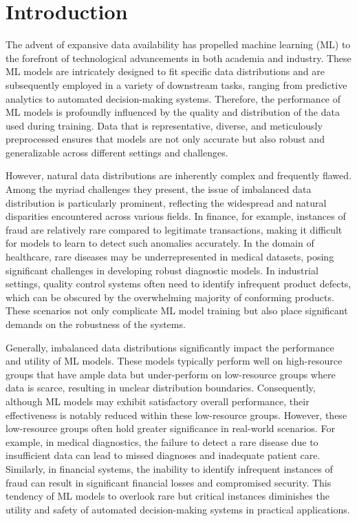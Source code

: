 \section{Introduction}
\label{sec:intro}

The advent of expansive data availability has propelled machine learning (ML) to the forefront of technological advancements in both academia and industry. These ML models are intricately designed to fit specific data distributions and are subsequently employed in a variety of downstream tasks, ranging from predictive analytics to automated decision-making systems. Therefore, the performance of ML models is profoundly influenced by the quality and distribution of the data used during training. Data that is representative, diverse, and meticulously preprocessed ensures that models are not only accurate but also robust and generalizable across different settings and challenges.

However, natural data distributions are inherently complex and frequently flawed. Among the myriad challenges they present, the issue of imbalanced data distribution is particularly prominent, reflecting the widespread and natural disparities encountered across various fields. In finance, for example, instances of fraud are relatively rare compared to legitimate transactions, making it difficult for models to learn to detect such anomalies accurately. In the domain of healthcare, rare diseases may be underrepresented in medical datasets, posing significant challenges in developing robust diagnostic models. In industrial settings, quality control systems often need to identify infrequent product defects, which can be obscured by the overwhelming majority of conforming products. These scenarios not only complicate ML model training but also place significant demands on the robustness of the systems.

Generally, imbalanced data distributions significantly impact the performance and utility of ML models. These models typically perform well on high-resource groups that have ample data but under-perform on low-resource groups where data is scarce, resulting in unclear distribution boundaries. Consequently, although ML models may exhibit satisfactory overall performance, their effectiveness is notably reduced within these low-resource groups. However, these low-resource groups often hold greater significance in real-world scenarios. For example, in medical diagnostics, the failure to detect a rare disease due to insufficient data can lead to missed diagnoses and inadequate patient care. Similarly, in financial systems, the inability to identify infrequent instances of fraud can result in significant financial losses and compromised security. This tendency of ML models to overlook rare but critical instances diminishes the utility and safety of automated decision-making systems in practical applications.

